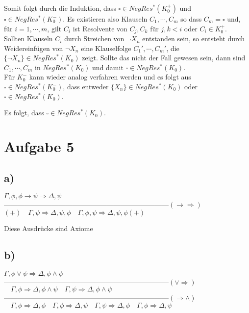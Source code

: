 \documentclass[11pt, a4paper]{article}
\renewcommand{\v}{\vee}
\newcommand{\n}{\wedge}
\begin{document}
Somit folgt durch die Induktion, dass $\square \in NegRes^*(K_0^+)$ und $\square \in NegRes^*(K_0^-)$.
Es existieren also Klauseln $C_1,\cdots,C_m$ so dass $C_m = \square$ und, für $i=1,\cdots,m$, gilt $C_i$ ist Resolvente von $C_j,C_k$ für $j,k < i$ oder $C_i \in K_0^+$.\\
Sollten Klauseln $C_i$ durch Streichen von $\neg X_n$ entstanden sein, so entsteht durch Weidereinfügen von $\neg X_n$ eine Klauselfolge $C_1',\cdots,C_m'$, die $\{ \neg X_n \} \in NegRes^*(K_0)$ zeigt.
Sollte das nicht der Fall gewesen sein, dann sind $C_1,\cdots,C_m$ in $NegRes^*(K_0)$ und damit $\square \in NegRes^*(K_0)$.\\
Für $K_0^-$ kann wieder analog verfahren werden und es folgt aus $\square \in NegRes^*(K_0^-)$, dass entweder $\{X_n\} \in NegRes^*(K_0)$ oder $\square \in NegRes^*(K_0)$.

Es folgt, dass $\square \in NegRes^*(K_0)$.


\section*{Aufgabe 5}
\subsection*{a)}
$\Gamma, \phi, \phi \rightarrow \psi \Rightarrow \Delta, \psi$\\
------------------------------------------------------------------------$(\rightarrow \Rightarrow)$\\
$(+)\quad\Gamma, \psi \Rightarrow \Delta, \psi, \phi \quad \Gamma, \phi, \psi \Rightarrow \Delta, \psi, \phi(+)$

Diese Ausdrücke sind Axiome

\subsection*{b)}
$\Gamma, \phi \v \psi \Rightarrow \Delta, \phi \n \psi$\\
------------------------------------------------------------------------$(\v \Rightarrow)$\\
$\quad\Gamma, \phi \Rightarrow \Delta, \phi \n \psi \quad \Gamma, \psi \Rightarrow \Delta, \phi \n \psi$\\
------------------------------------------------------------------------$(\Rightarrow \n)$\\
$\quad\Gamma, \phi \Rightarrow \Delta, \phi \quad \Gamma, \phi \Rightarrow \Delta, \psi \quad \Gamma, \psi \Rightarrow \Delta, \phi \quad \Gamma, \phi \Rightarrow \Delta, \psi$
\end{document}
